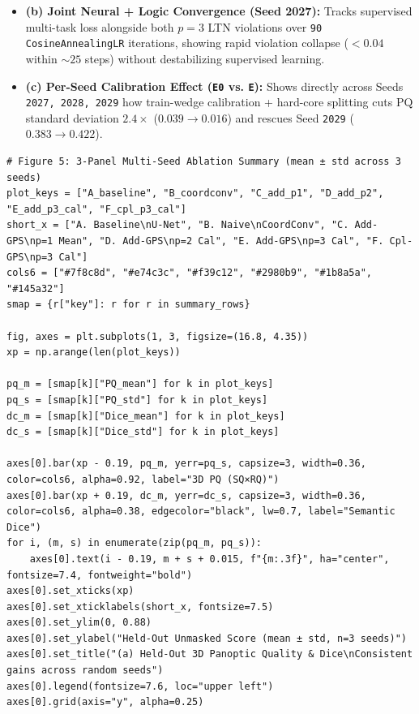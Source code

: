 \documentclass[10pt,a4paper]{article}
\renewcommand{\_}{\origunderscore\allowbreak}
\begin{document}
\begin{itemize}
\begin{itemize}
\item \textbf{(b) Joint Neural + Logic Convergence (Seed 2027):} Tracks supervised multi-task loss alongside both $p = 3$ LTN violations over \texttt{90} \texttt{CosineAnnealingLR} iterations, showing rapid violation collapse ($< 0.04$ within $\sim 25$ steps) without destabilizing supervised learning.
\item \textbf{(c) Per-Seed Calibration Effect (\texttt{E0} vs. \texttt{E}):} Shows directly across Seeds \texttt{2027, 2028, 2029} how train-wedge calibration + hard-core splitting cuts $\text{PQ}$ standard deviation $2.4\times$ ($0.039 \to 0.016$) and rescues Seed \texttt{2029} ($0.383 \to 0.422$).
\end{itemize}
\end{itemize}

\begin{codebox}
\begin{lstlisting}[style=pybmed]
# Figure 5: 3-Panel Multi-Seed Ablation Summary (mean ± std across 3 seeds)
plot_keys = ["A_baseline", "B_coordconv", "C_add_p1", "D_add_p2", "E_add_p3_cal", "F_cpl_p3_cal"]
short_x = ["A. Baseline\nU-Net", "B. Naive\nCoordConv", "C. Add-GPS\np=1 Mean", "D. Add-GPS\np=2 Cal", "E. Add-GPS\np=3 Cal", "F. Cpl-GPS\np=3 Cal"]
cols6 = ["#7f8c8d", "#e74c3c", "#f39c12", "#2980b9", "#1b8a5a", "#145a32"]
smap = {r["key"]: r for r in summary_rows}

fig, axes = plt.subplots(1, 3, figsize=(16.8, 4.35))
xp = np.arange(len(plot_keys))

pq_m = [smap[k]["PQ_mean"] for k in plot_keys]
pq_s = [smap[k]["PQ_std"] for k in plot_keys]
dc_m = [smap[k]["Dice_mean"] for k in plot_keys]
dc_s = [smap[k]["Dice_std"] for k in plot_keys]

axes[0].bar(xp - 0.19, pq_m, yerr=pq_s, capsize=3, width=0.36, color=cols6, alpha=0.92, label="3D PQ (SQ×RQ)")
axes[0].bar(xp + 0.19, dc_m, yerr=dc_s, capsize=3, width=0.36, color=cols6, alpha=0.38, edgecolor="black", lw=0.7, label="Semantic Dice")
for i, (m, s) in enumerate(zip(pq_m, pq_s)):
    axes[0].text(i - 0.19, m + s + 0.015, f"{m:.3f}", ha="center", fontsize=7.4, fontweight="bold")
axes[0].set_xticks(xp)
axes[0].set_xticklabels(short_x, fontsize=7.5)
axes[0].set_ylim(0, 0.88)
axes[0].set_ylabel("Held-Out Unmasked Score (mean ± std, n=3 seeds)")
axes[0].set_title("(a) Held-Out 3D Panoptic Quality & Dice\nConsistent gains across random seeds")
axes[0].legend(fontsize=7.6, loc="upper left")
axes[0].grid(axis="y", alpha=0.25)


\end{lstlisting}
\end{codebox}
\end{document}
